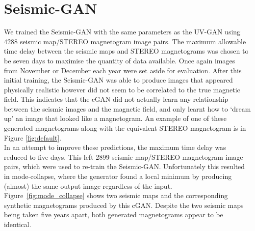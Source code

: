 \documentclass[11pt,a4paper,onecolumn]{report}
\begin{document}
\section{Seismic-GAN}
\label{sec:train_seismic}

We trained the Seismic-GAN with the same parameters as the UV-GAN using 4288
seismic map/STEREO magnetogram image pairs. The maximum allowable time delay
between the seismic maps and STEREO magnetograms was chosen to be seven days to
maximise the quantity of data available. Once again images from November or
December each year were set aside for evaluation. After this initial training,
the Seismic-GAN was able to produce images that appeared physically realistic
however did not seem to be correlated to the true magnetic field. This indicates
that the cGAN did not actually learn any relationship between the seismic images
and the magnetic field, and only learnt how to `dream up' an image that looked
like a magnetogram. An example of one of these generated magnetograms along with
the equivalent STEREO magnetogram is in Figure \ref{fig:default}. \\



In an attempt to improve these predictions, the maximum time delay was reduced
to five days. %
This left 2899 seismic map/STEREO magnetogram image pairs, which were used to
re-train the Seismic-GAN. Unfortunately this resulted in mode-collapse, where
the generator found a local minimum by producing (almost) the same output
image regardless of the input. Figure~\ref{fig:mode_collapse} shows two seismic
maps and the corresponding synthetic magnetograms produced by this cGAN. Despite
the two seismic maps being taken five years apart, both generated magnetograms
appear to be identical.\\
\end{document}
